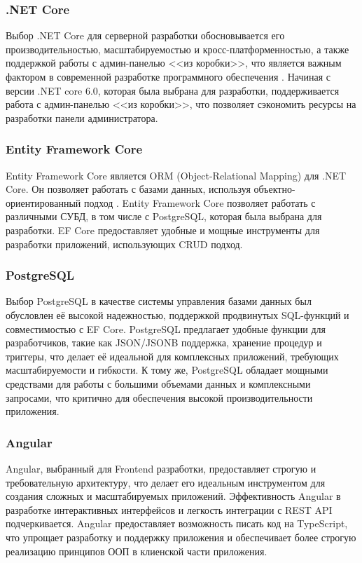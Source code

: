 \subsubsection{.NET Core}
Выбор .NET Core для серверной разработки обосновывается его производительностью, масштабируемостью и кросс-платформенностью, а также поддержкой работы с админ-панелью <<из коробки>>, что является важным фактором в современной разработке программного обеспечения \cite{mark_price}.
Начиная с версии .NET core 6.0, которая была выбрана для разработки, поддерживается работа с админ-панелью <<из коробки>>, что позволяет сэкономить ресурсы на разработки панели администратора.

\subsubsection{Entity Framework Core}
Entity Framework Core является ORM (Object-Relational Mapping) для .NET Core. Он позволяет работать с базами данных, используя объектно-ориентированный подход \cite{grinchenko}. Entity Framework Core позволяет работать с различными СУБД, в том числе с PostgreSQL, которая была выбрана для разработки. EF Core предоставляет удобные и мощные инструменты для разработки приложений, использующих CRUD подход.

\subsubsection{PostgreSQL}
Выбор PostgreSQL в качестве системы управления базами данных был обусловлен её высокой надежностью, поддержкой продвинутых SQL-функций и совместимостью с EF Core. PostgreSQL предлагает удобные функции для разработчиков, такие как JSON/JSONB поддержка, хранение процедур и триггеры, что делает её идеальной для комплексных приложений, требующих масштабируемости и гибкости. К тому же, PostgreSQL обладает мощными средствами для работы с большими объемами данных и комплексными запросами, что критично для обеспечения высокой производительности приложения.

\subsubsection{Angular}
Angular, выбранный для Frontend разработки, предоставляет строгую и требовательную архитектуру, что делает его идеальным инструментом для создания сложных и масштабируемых приложений. Эффективность Angular в разработке интерактивных интерфейсов и легкость интеграции с REST API подчеркивается. Angular предоставляет возможность писать код на TypeScript, что упрощает разработку и поддержку приложения и обеспечивает более строгую реализацию принципов ООП в клиенской части приложения.

